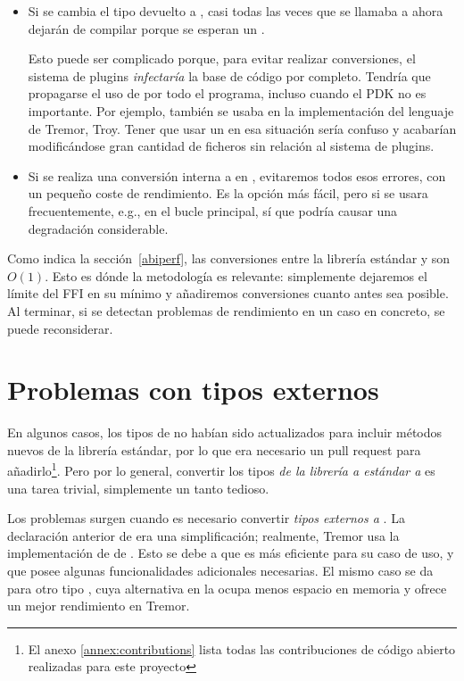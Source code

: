 \begin{itemize}
    \item Si se cambia el tipo devuelto a , casi todas las veces
        que se llamaba a  ahora dejarán de compilar porque se
        esperan un .

        Esto puede ser complicado porque, para evitar realizar conversiones, el
        sistema de plugins \emph{infectaría} la base de código por completo.
        Tendría que propagarse el uso de  por todo el programa,
        incluso cuando el PDK no es importante. Por ejemplo, 
        también se usaba en la implementación del lenguaje de Tremor, Troy.
        Tener que usar un  en esa situación sería confuso y
        acabarían modificándose gran cantidad de ficheros sin relación al
        sistema de plugins.

    \item Si se realiza una conversión interna a  en
        , evitaremos todos esos errores, con un pequeño coste de
        rendimiento. Es la opción más fácil, pero si  se
        usara frecuentemente, e.g., en el bucle principal, sí que podría causar
        una degradación considerable.
\end{itemize}

Como indica la sección~\ref{abiperf}, las conversiones entre la librería
estándar y \abistable son $O(1)$. Esto es dónde la metodología \work es
relevante: simplemente dejaremos el límite del FFI en su mínimo y añadiremos
conversiones cuanto antes sea posible. Al terminar, si se detectan problemas de
rendimiento en un caso en concreto, se puede reconsiderar.

\section{Problemas con tipos externos}\label{sec:abi_ext}

En algunos casos, los tipos de \abistable no habían sido actualizados para
incluir métodos nuevos de la librería estándar, por lo que era necesario un pull
request para añadirlo\footnote{El anexo \ref{annex:contributions} lista todas
las contribuciones de código abierto realizadas para este proyecto}. Pero por lo
general, convertir los tipos \emph{de la librería a estándar a \abistable} es
una tarea trivial, simplemente un tanto tedioso.

Los problemas surgen cuando es necesario convertir \emph{tipos externos a
\abistable}. La declaración anterior de  era una simplificación;
realmente, Tremor usa la implementación de  de
. Esto se debe a que es más eficiente para su caso de uso, y
que posee algunas funcionalidades adicionales necesarias. El mismo caso se da
para otro tipo , cuya alternativa en la \crate {} ocupa
menos espacio en memoria y ofrece un mejor rendimiento en Tremor.

